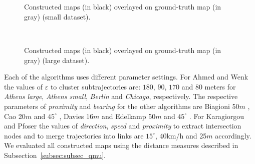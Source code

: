 \documentclass[natbib]{svjour3}                    \smartqed  \usepackage[table]{xcolor}
\begin{document}
\begin{figure}[htbp]
 \begin{center}
	 \\
\\	 
	 
	 \end{center}
\caption{Constructed maps (in black) overlayed on ground-truth map (in gray) (small dataset).}
\label{fig:rn_alls}
\end{figure}
	 
\begin{figure}[htbp]
 \begin{center}	
	 \\
	 \end{center}
\caption{Constructed maps (in black) overlayed on ground-truth map (in gray)  (large dataset).}
\label{fig:rn_allb}
\end{figure}

Each of the algorithms uses different parameter settings.
For Ahmed and Wenk \cite{csm_esa2012} the values of $\varepsilon$ to cluster subtrajectories are: $180$, $90$, $170$ and $80$ meters for \emph{Athens large}, \emph{Athens small}, \emph{Berlin} and \emph{Chicago}, respectively. 
The respective parameters of \emph{proximity} and \emph{bearing} for the other algorithms are Biagioni 50$m$ \cite{Biagioni:2012:MIF:2424321.2424333}, Cao 20$m$ and $45^{\circ}$ \cite{Cao:2009:GTR:1653771.1653776}, Davies 16$m$ \cite{Davies:2006:SDR:1175887.1176088} and Edelkamp 50$m$ and $45^{\circ}$ \cite{edelkamp:2003:rpmi}. 
For Karagiorgou and Pfoser \cite{Karagiorgou:2012:VTD:2424321.2424334} the values of \emph{direction}, \emph{speed} and \emph{proximity} to extract intersection nodes and to merge trajectories into links are $15^{\circ}$, 40km/h and 25$m$ accordingly. We evaluated all constructed maps using the distance measures described in Subsection~\ref{subsec:subsec_qmu}.
 
\end{document}
